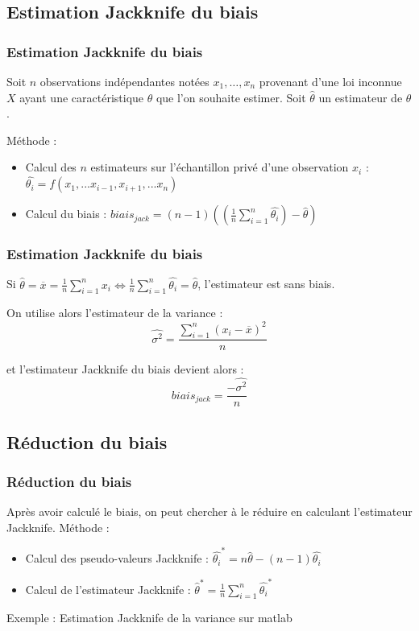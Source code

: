 \documentclass[handout]{beamer}
\begin{document}
		\subsection{Estimation Jackknife du biais}
		\begin{frame}
			\frametitle{Estimation Jackknife du biais}
			Soit $n$ observations indépendantes notées $x_1, \dots, x_n$ provenant d'une loi inconnue $X$ ayant une caractéristique $\theta$ que l'on souhaite estimer. Soit $\hat{\theta}$ un estimateur de $\theta$.

			\vspace{15px}
			Méthode :
			\begin{itemize}
				\item Calcul des $n$ estimateurs sur l'échantillon privé d'une observation $x_i$ : $\hat{\theta_i} = f(x_1,...x_{i-1},x_{i+1},...x_n)$
				\item Calcul du biais : $biais_{jack} = (n - 1)((\frac{1}{n} \sum\limits_{i=1}^n \hat{\theta_i}) - \hat{\theta})$
			\end{itemize}


		\end{frame}

		\begin{frame}
			\frametitle{Estimation Jackknife du biais}
			Si $\hat{\theta} = \overline{x} = \frac{1}{n} \sum\limits_{i=1}^n x_i \Leftrightarrow \frac{1}{n} \sum\limits_{i=1}^n \hat{\theta_i} = \hat{\theta}$, l'estimateur est sans biais.

			\vspace{15px}
			On utilise alors l'estimateur de la variance :
			\[\hat{\sigma^2} = \frac{\sum\limits_{i=1}^n (x_i - \overline{x})^2}{n} \]

			et l'estimateur Jackknife du biais devient alors :
			\[biais_{jack} = \frac{-\hat{\sigma^2}}{n} \]
		\end{frame}
		
		\subsection{Réduction du biais}		
		\begin{frame}
			\frametitle{Réduction du biais}
			Après avoir calculé le biais, on peut chercher à le réduire en calculant l'estimateur Jackknife.
			\vspace{15px}
			Méthode :
			\begin{itemize}
				\item Calcul des pseudo-valeurs Jackknife : $\hat{\theta_i}^* = n\hat{\theta} - (n-1) \hat{\theta_i}$
				\item Calcul de l'estimateur Jackknife : $\hat{\theta}^* = \frac{1}{n} \sum\limits_{i=1}^n \hat{\theta_i}^*$
			\end{itemize}
			\vspace{15px}
			Exemple : Estimation Jackknife de la variance sur matlab
		\end{frame}
\end{document}
